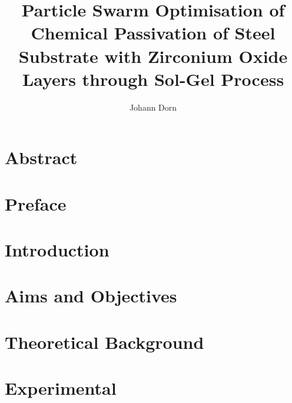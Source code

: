 \documentclass[a4paper]{article}
\title{Particle Swarm Optimisation of Chemical Passivation of Steel Substrate with Zirconium Oxide Layers through Sol-Gel Process}
\author{Johann Dorn}
\begin{document}
\maketitle


\clearpage
\section*{Abstract}


\section*{Preface}
%

\tableofcontents
\clearpage
\printglossaries
\clearpage

\section{Introduction}                                
\label{sec:intro}


\section{Aims and Objectives}
\label{sec:aims}


\section{Theoretical Background}
\label{sec:theoretical}


\section{Experimental}
\label{sec:exp}

\clearpage
\end{document}
